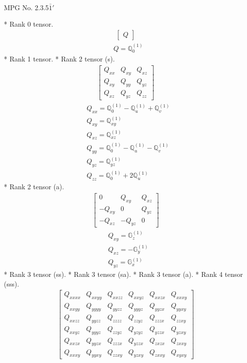 \documentclass[fleqn,8pt,landscape]{jsarticle}
\begin{document}
\setcounter{MaxMatrixCols}{32}

\renewcommand{\tablename}{Table~}
\renewcommand{\figurename}{Figure~}
\begin{center}
\LARGE
MPG No. 2.3.5\quad$\bar{1}'$
\end{center}
* Rank 0 tensor.
\begin{align*}
\begin{bmatrix} Q \end{bmatrix}
\end{align*}
\begin{align*}
& Q = \mathbb{Q}_{0}^{(1)}
\end{align*}
* Rank 1 tensor.
* Rank 2 tensor (s).
\begin{align*}
\begin{bmatrix} Q_{xx} & Q_{xy} & Q_{xz} \\ Q_{xy} & Q_{yy} & Q_{yz} \\ Q_{xz} & Q_{yz} & Q_{zz} \end{bmatrix}
\end{align*}
\begin{align*}
& Q_{xx} = \mathbb{Q}_{0}^{(1)} - \mathbb{Q}_{u}^{(1)} + \mathbb{Q}_{v}^{(1)} \\
& Q_{xy} = \mathbb{Q}_{xy}^{(1)} \\
& Q_{xz} = \mathbb{Q}_{xz}^{(1)} \\
& Q_{yy} = \mathbb{Q}_{0}^{(1)} - \mathbb{Q}_{u}^{(1)} - \mathbb{Q}_{v}^{(1)} \\
& Q_{yz} = \mathbb{Q}_{yz}^{(1)} \\
& Q_{zz} = \mathbb{Q}_{0}^{(1)} + 2 \mathbb{Q}_{u}^{(1)}
\end{align*}
* Rank 2 tensor (a).
\begin{align*}
\begin{bmatrix} 0 & Q_{xy} & Q_{xz} \\ - Q_{xy} & 0 & Q_{yz} \\ - Q_{xz} & - Q_{yz} & 0 \end{bmatrix}
\end{align*}
\begin{align*}
& Q_{xy} = \mathbb{G}_{z}^{(1)} \\
& Q_{xz} = - \mathbb{G}_{y}^{(1)} \\
& Q_{yz} = \mathbb{G}_{x}^{(1)}
\end{align*}
* Rank 3 tensor (ss).
* Rank 3 tensor (sa).
* Rank 3 tensor (a).
* Rank 4 tensor (sss).
\begin{align*}
\begin{bmatrix} Q_{xxxx} & Q_{xxyy} & Q_{xxzz} & Q_{xxyz} & Q_{xxzx} & Q_{xxxy} \\ Q_{xxyy} & Q_{yyyy} & Q_{yyzz} & Q_{yyyz} & Q_{yyzx} & Q_{yyxy} \\ Q_{xxzz} & Q_{yyzz} & Q_{zzzz} & Q_{zzyz} & Q_{zzzx} & Q_{zzxy} \\ Q_{xxyz} & Q_{yyyz} & Q_{zzyz} & Q_{yzyz} & Q_{yzzx} & Q_{yzxy} \\ Q_{xxzx} & Q_{yyzx} & Q_{zzzx} & Q_{yzzx} & Q_{zxzx} & Q_{zxxy} \\ Q_{xxxy} & Q_{yyxy} & Q_{zzxy} & Q_{yzxy} & Q_{zxxy} & Q_{xyxy} \end{bmatrix}
\end{align*}
\end{document}
